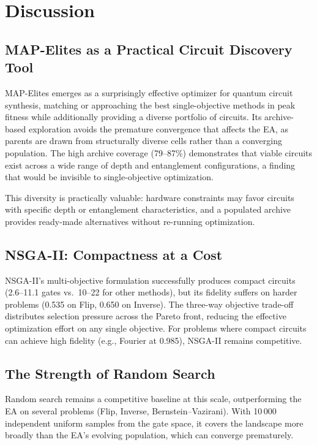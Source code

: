 \documentclass[twocolumn,11pt]{article}
\begin{document}
\section{Discussion}\label{sec:discussion}

\subsection{MAP-Elites as a Practical Circuit Discovery Tool}

MAP-Elites emerges as a surprisingly effective optimizer for quantum circuit
synthesis, matching or approaching the best single-objective methods in peak
fitness while additionally providing a diverse portfolio of circuits.  Its
archive-based exploration avoids the premature convergence that affects the EA,
as parents are drawn from structurally diverse cells rather than a converging
population.  The high archive coverage (79--87\%) demonstrates that viable
circuits exist across a wide range of depth and entanglement configurations, a
finding that would be invisible to single-objective optimization.

This diversity is practically valuable: hardware constraints may favor circuits
with specific depth or entanglement characteristics, and a populated archive
provides ready-made alternatives without re-running optimization.

\subsection{NSGA-II: Compactness at a Cost}

NSGA-II's multi-objective formulation successfully produces compact circuits
(2.6--11.1 gates vs.\ 10--22 for other methods), but its fidelity suffers on
harder problems (0.535 on Flip, 0.650 on Inverse).  The three-way
objective trade-off distributes selection pressure across the Pareto front,
reducing the effective optimization effort on any single objective.  For
problems where compact circuits can achieve high fidelity (e.g., Fourier at
0.985), NSGA-II remains competitive.

\subsection{The Strength of Random Search}

Random search remains a competitive baseline at this scale, outperforming the EA
on several problems (Flip, Inverse, Bernstein--Vazirani).  With 10\,000
independent uniform samples from the gate space, it covers the landscape more
broadly than the EA's evolving population, which can converge prematurely.
\end{document}
